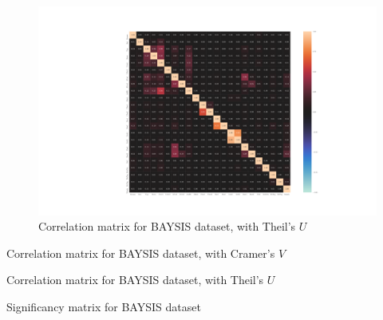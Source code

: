 \documentclass[a4paper,12pt]{report}
\newcommand{\nocontentsline}[3]{}
\newcommand{\tocless}[2]{\bgroup\let\addcontentsline=\nocontentsline#1{#2}\egroup}
\begin{document}
\begin{appendices}
\label{appendix_baysis_dataset_corr_theils}
\begin{figure}[h]
	\centering
	\includegraphics[scale=0.4]{../CorrAnalysis/data/BAYSIS/01_dataset/plots/baysis_dataset_corr_theils}
	\caption{Correlation matrix for BAYSIS dataset, with Theil's $U$}
	\label{img:appendix_correlation_matrix_dataset_theils}
\end{figure}
\restoregeometry

\begin{table} %
\tiny
\setlength{\tabcolsep}{4pt}
\centering

\caption{Correlation matrix for BAYSIS dataset, with Cramer's $V$}
\end{table} %

\begin{table} %
\tiny
\setlength{\tabcolsep}{4pt}
\centering

\caption{Correlation matrix for BAYSIS dataset, with Theil's $U$}
\end{table} %

\begin{table} %
\tiny
\setlength{\tabcolsep}{4pt}
\centering

\caption{Significancy matrix for BAYSIS dataset}
\end{table} %
\restoregeometry



\end{appendices}
\end{document}
